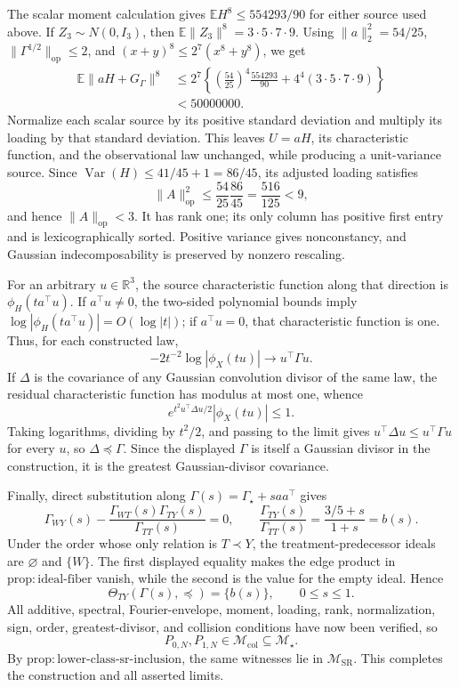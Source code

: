 The scalar moment calculation gives \(\mathbb EH^8\le554293/90\) for either source used above.  If \(Z_3\sim N(0,I_3)\), then
\(\mathbb E\|Z_3\|^8=3\cdot5\cdot7\cdot9\).  Using
\(\|a\|_2^2=54/25\), \(\|\Gamma^{1/2}\|_{\mathrm{op}}\le2\), and \((x+y)^8\le2^7(x^8+y^8)\), we get
\[
 \begin{aligned}
 \mathbb E\|aH+G_\Gamma\|^8
 &\le2^7\left\{
 \left(\frac{54}{25}\right)^4\frac{554293}{90}
 +4^4(3\cdot5\cdot7\cdot9)\right\}\\
 &<50000000.
 \end{aligned}
\]
Normalize each scalar source by its positive standard deviation and multiply its loading by that standard deviation.  This leaves \(U=aH\), its characteristic function, and the observational law unchanged, while producing a unit-variance source.  Since
\(\operatorname{Var}(H)\le41/45+1=86/45\), its adjusted loading satisfies
\[
 \|A\|_{\mathrm{op}}^2
 \le\frac{54}{25}\frac{86}{45}
 =\frac{516}{125}<9,
\]
and hence \(\|A\|_{\mathrm{op}}<3\).  It has rank one; its only column has positive first entry and is lexicographically sorted.  Positive variance gives nonconstancy, and Gaussian indecomposability is preserved by nonzero rescaling.

For an arbitrary \(u\in\mathbb R^3\), the source characteristic function along that direction is \(\phi_H(ta^\top u)\).  If \(a^\top u\ne0\), the two-sided polynomial bounds imply
\(\log|\phi_H(ta^\top u)|=O(\log|t|)\); if \(a^\top u=0\), that characteristic function is one.  Thus, for each constructed law,
\[
 -2t^{-2}\log|\phi_X(tu)|\longrightarrow u^\top\Gamma u.
\]
If \(\Delta\) is the covariance of any Gaussian convolution divisor of the same law, the residual characteristic function has modulus at most one, whence
\[
 e^{t^2u^\top\Delta u/2}|\phi_X(tu)|\le1.
\]
Taking logarithms, dividing by \(t^2/2\), and passing to the limit gives
\(u^\top\Delta u\le u^\top\Gamma u\) for every \(u\), so \(\Delta\preceq\Gamma\).  Since the displayed \(\Gamma\) is itself a Gaussian divisor in the construction, it is the greatest Gaussian-divisor covariance.

Finally, direct substitution along \(\Gamma(s)=\Gamma_\star+saa^\top\) gives
\[
 \Gamma_{WY}(s)
 -\frac{\Gamma_{WT}(s)\Gamma_{TY}(s)}{\Gamma_{TT}(s)}=0,
 \qquad
 \frac{\Gamma_{TY}(s)}{\Gamma_{TT}(s)}
 =\frac{3/5+s}{1+s}=b(s).
\]
Under the order whose only relation is \(T\prec Y\), the treatment-predecessor ideals are \(\varnothing\) and \(\{W\}\).  The first displayed equality makes the edge product in \(\mathrm{prop:ideal\text{-}fiber}\) vanish, while the second is the value for the empty ideal.  Hence
\[
 \Theta_{TY}(\Gamma(s),\preceq)=\{b(s)\},
 \qquad 0\le s\le1.
\]
All additive, spectral, Fourier-envelope, moment, loading, rank, normalization, sign, order, greatest-divisor, and collision conditions have now been verified, so
\[
 P_{0,N},P_{1,N}\in\mathcal M_{\mathrm{col}}
 \subseteq\mathcal M_\star.
\]
By \(\mathrm{prop:lower\text{-}class\text{-}sr\text{-}inclusion}\), the same witnesses lie in \(\mathcal M_{\mathrm{SR}}\).  This completes the construction and all asserted limits.

